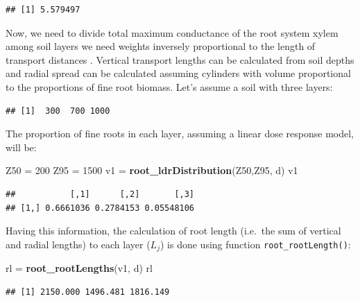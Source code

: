 \documentclass[]{book}
\newenvironment{Shaded}{\begin{snugshade}}{\end{snugshade}}
\newcommand{\KeywordTok}[1]{\textcolor[rgb]{0.13,0.29,0.53}{\textbf{#1}}}
\newcommand{\DecValTok}[1]{\textcolor[rgb]{0.00,0.00,0.81}{#1}}
\newcommand{\StringTok}[1]{\textcolor[rgb]{0.31,0.60,0.02}{#1}}
\newcommand{\OperatorTok}[1]{\textcolor[rgb]{0.81,0.36,0.00}{\textbf{#1}}}
\newcommand{\NormalTok}[1]{#1}
\begin{document}
\begin{verbatim}
## [1] 5.579497
\end{verbatim}

Now, we need to divide total maximum conductance of the root system
xylem among soil layers we need weights inversely proportional to the
length of transport distances \citep{Sperry2016}. Vertical transport
lengths can be calculated from soil depths and radial spread can be
calculated assuming cylinders with volume proportional to the
proportions of fine root biomass. Let's assume a soil with three layers:

\begin{Shaded}
\end{Shaded}

\begin{verbatim}
## [1]  300  700 1000
\end{verbatim}

The proportion of fine roots in each layer, assuming a linear dose
response model, will be:

\begin{Shaded}
\begin{Highlighting}[]
\NormalTok{Z50 =}\StringTok{ }\DecValTok{200}
\NormalTok{Z95 =}\StringTok{ }\DecValTok{1500}
\NormalTok{v1 =}\StringTok{ }\KeywordTok{root_ldrDistribution}\NormalTok{(Z50,Z95, d)}
\NormalTok{v1}
\end{Highlighting}
\end{Shaded}

\begin{verbatim}
##           [,1]      [,2]       [,3]
## [1,] 0.6661036 0.2784153 0.05548106
\end{verbatim}

Having this information, the calculation of root length (i.e.~the sum of
vertical and radial lengths) to each layer (\(L_j\)) is done using
function \texttt{root\_rootLength()}:

\begin{Shaded}
\begin{Highlighting}[]
\NormalTok{rl =}\StringTok{ }\KeywordTok{root_rootLengths}\NormalTok{(v1, d)}
\NormalTok{rl}
\end{Highlighting}
\end{Shaded}

\begin{verbatim}
## [1] 2150.000 1496.481 1816.149
\end{verbatim}
\end{document}
